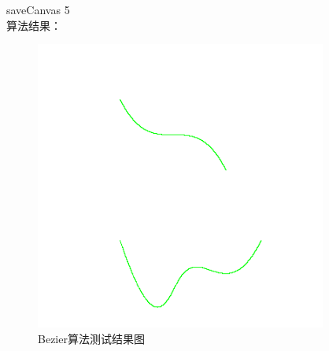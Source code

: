 \documentclass[a4paper,UTF8]{article}
\theoremstyle{definition}
\begin{document}
saveCanvas 5\\

算法结果：\\
\begin{figure}[h]
	\centering
	\includegraphics[scale=0.8]{figure/bezier.png}
	\caption{Bezier算法测试结果图}
	\label{fig:bezier-result}
\end{figure}
\end{document}

